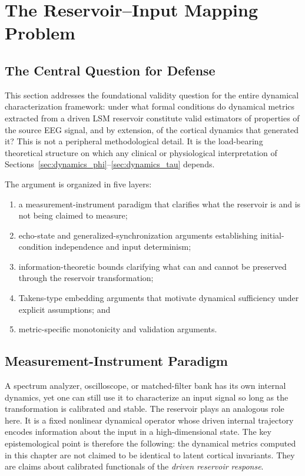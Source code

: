 \section{The Reservoir--Input Mapping Problem}
\label{sec:dynamics_fidelity}

\subsection{The Central Question for Defense}

This section addresses the foundational validity question for the entire dynamical characterization framework: under what formal conditions do dynamical metrics extracted from a driven LSM reservoir constitute valid estimators of properties of the source EEG signal, and by extension, of the cortical dynamics that generated it? This is not a peripheral methodological detail. It is the load-bearing theoretical structure on which any clinical or physiological interpretation of Sections~\ref{sec:dynamics_phi}--\ref{sec:dynamics_tau} depends.

The argument is organized in five layers:
\begin{enumerate}
    \item a measurement-instrument paradigm that clarifies what the reservoir is and is not being claimed to measure;
    \item echo-state and generalized-synchronization arguments establishing initial-condition independence and input determinism;
    \item information-theoretic bounds clarifying what can and cannot be preserved through the reservoir transformation;
    \item Takens-type embedding arguments that motivate dynamical sufficiency under explicit assumptions; and
    \item metric-specific monotonicity and validation arguments.
\end{enumerate}

\subsection{Measurement-Instrument Paradigm}

A spectrum analyzer, oscilloscope, or matched-filter bank has its own internal dynamics, yet one can still use it to characterize an input signal so long as the transformation is calibrated and stable. The reservoir plays an analogous role here. It is a fixed nonlinear dynamical operator whose driven internal trajectory encodes information about the input in a high-dimensional state. The key epistemological point is therefore the following: the dynamical metrics computed in this chapter are not claimed to be identical to latent cortical invariants. They are claims about calibrated functionals of the \emph{driven reservoir response}.

